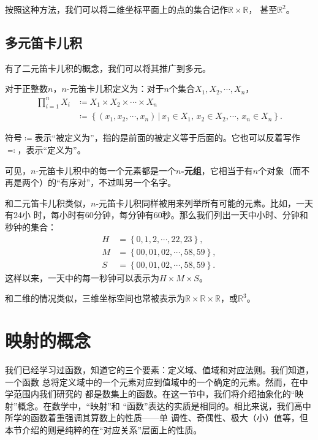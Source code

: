 按照这种方法，我们可以将二维坐标平面上的点的集合记作$\mathbb{R}\times\mathbb{R}$，
甚至$\mathbb{R}^2$。

\subsection{多元笛卡儿积}

有了二元笛卡儿积的概念，我们可以将其推广到多元。

\begin{rawdef}[$n$-元笛卡儿积]
    对于正整数$n$，$n$-元笛卡儿积定义为：对于$n$个集合$X_{1},X_{2},\cdots,X_{n}$，
    \begin{align*}
        \prod_{i=1}^n X_{i}&\coloneq X_{1}\times X_{2}\times \cdots \times X_{n} \\
                           &\coloneq \left\{ \left( x_{1},x_{2},\cdots,x_{n} 
                               \right) \,|\, x_{1} \in X_{1},\, x_{2}\in X_{2},
                           \cdots,\,x_{n}\in X_{n}\right\}.
    \end{align*}
\end{rawdef}

符号$\coloneq$表示“被定义为”，指的是前面的被定义等于后面的。它也可以反着写作
$\eqcolon$，表示“定义为”。\index{$\coloneq$}

可见，$n$-元笛卡儿积中的每一个元素都是一个\textbf{$n$-元组}，它相当于有$n$个对象（而不再是两个）的“有序对”，不过叫另一个名字。

和二元笛卡儿积类似，$n$-元笛卡儿积同样被用来列举所有可能的元素。比如，一天有24小
时，每小时有60分钟，每分钟有60秒。那么我们列出一天中小时、分钟和秒钟的集合：
\begin{align*}
    H &= \left\{ 0,1,2,\cdots,22,23 \right\},\\
    M &= \left\{ 00,01,02,\cdots,58,59 \right\},\\
    S &= \left\{ 00,01,02,\cdots,58,59 \right\}.
\end{align*}
这样以来，一天中的每一秒钟可以表示为$H\times M\times S$。

和二维的情况类似，三维坐标空间也常被表示为$\mathbb{R}\times\mathbb{R}
\times\mathbb{R}$，或$\mathbb{R}^3$。

\section{映射的概念}

我们已经学习过函数，知道它的三个要素：定义域、值域和对应法则。我们知道，一个函数
总将定义域中的一个元素对应到值域中的一个确定的元素。然而，在中学范围内我们研究的
都是数集上的函数。在这一节中，我们将介绍抽象化的“映射”概念。在数学中，“映射”和
“函数”表达的实质是相同的。相比来说，我们高中所学的函数着重强调其算数上的性质——单
调性、奇偶性、极大（小）值等，但本节介绍的则是纯粹的在“对应关系”层面上的性质。

